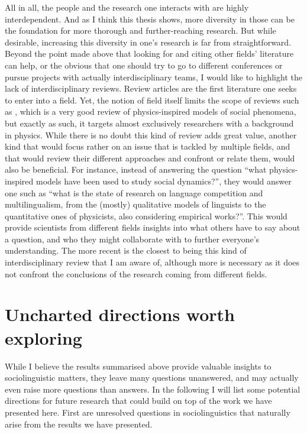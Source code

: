\documentclass[../thesis.tex]{subfiles}
\begin{document}
All in all, the people and the research one interacts with are highly interdependent. And
as I think this thesis shows, more diversity in those can be the foundation for more
thorough and further-reaching research. But while desirable, increasing this diversity
in one's research is far from straightforward. Beyond the point made above that looking
for and citing other fields' literature can help, or the obvious that one should try to
go to different conferences or pursue projects with actually interdisciplinary teams, I
would like to highlight the lack of interdisciplinary reviews. Review articles are the
first literature one seeks to enter into a field. Yet, the notion of field itself limits
the scope of reviews such as \cite{CastellanoStatisticalPhysics2009}, which is a very
good review of physics-inspired models of social phenomena, but exactly as such, it
targets almost exclusively researchers with a background in physics. While there is no
doubt this kind of review adds great value, another kind that would focus rather on an
issue that is tackled by multiple fields, and that would review their different
approaches and confront or relate them, would also be beneficial. For instance, instead
of answering the question ``what physics-inspired models have been used to study social
dynamics?'', they would answer one such as ``what is the state of research on language
competition and multilingualism, from the (mostly) qualitative models of linguists to
the quantitative ones of physicists, also considering empirical works?''. This would
provide scientists from different fields insights into  what others have to say about a
question, and who they might collaborate with to further everyone's understanding. The
more recent \cite{BoissonneaultSystematicInterdisciplinary2021} is the closest to being
this kind of interdisciplinary review that I am aware of, although more is necessary as
it does not confront the conclusions of the research coming from different fields.





\section{Uncharted directions worth exploring}
While I believe the results summarised above provide valuable insights to
sociolinguistic matters, they leave many questions unanswered, and may actually even
raise more questions than answers. In the following I will list some potential
directions for future research that could build on top of the work we have presented
here. First are unresolved questions in sociolinguistics that naturally arise from the
results we have presented.
\end{document}
